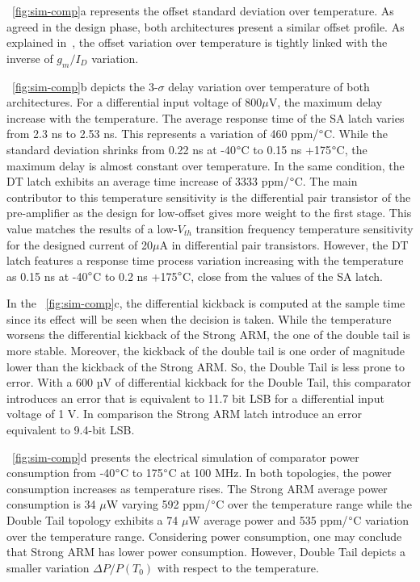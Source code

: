\figurename~\ref{fig:sim-comp}a represents the offset standard deviation over temperature. As agreed in the design phase, both architectures present a similar offset profile. As explained in~\cite{Fonseca2017}, the offset variation over temperature is tightly linked with the inverse of \(g_{m}/I_D\) variation.

\figurename~\ref{fig:sim-comp}b depicts the 3-\(\sigma \) delay variation over temperature of both architectures. For a differential input voltage of 800\(\mu \)V, the maximum delay increase with the temperature. The average response time of the SA latch varies from 2.3 ns to 2.53 ns. This represents a variation of 460 ppm/\(\degree \)C. While the standard deviation shrinks from 0.22 ns at -40\(\degree \)C to 0.15 ns +175\(\degree \)C, the maximum delay is almost constant over temperature. In the same condition, the DT latch exhibits an average time increase of 3333 ppm/\(\degree \)C. The main contributor to this temperature sensitivity is the differential pair transistor of the pre-amplifier as the design for low-offset gives more weight to the first stage. This value matches the results of a low-\(V_{th} \) transition frequency temperature sensitivity for the designed current of 20\(\mu \)A in differential pair transistors. However, the DT latch features a response time process variation increasing with the temperature as  0.15 ns at -40\(\degree \)C to 0.2 ns +175\(\degree \)C, close from the values of the SA latch.

In the \figurename~\ref{fig:sim-comp}c, the differential kickback is computed at the sample time since its effect will be seen when the decision is taken. While the temperature worsens the differential kickback of the Strong ARM, the one of the double tail is more stable. Moreover, the kickback of the double tail is one order of magnitude lower than the kickback of the Strong ARM\@. So, the Double Tail is less prone to error. With a 600 µV of differential kickback for the Double Tail, this comparator introduces an error that is equivalent to 11.7 bit LSB for a differential input voltage of 1 V. In comparison the Strong ARM latch introduce an error equivalent to 9.4-bit LSB\@.

\figurename~\ref{fig:sim-comp}d presents the electrical simulation of comparator power consumption from -40\(\degree \)C to 175\(\degree \)C at 100 MHz. In both topologies, the power consumption increases as temperature rises. The Strong ARM average power consumption is 34 \(\mu \)W varying 592 ppm/\(\degree \)C over the temperature range while the Double Tail topology exhibits a 74 \(\mu \)W average power and 535 ppm/\(\degree \)C variation over the temperature range. Considering power consumption, one may conclude that Strong ARM has lower power consumption. However, Double Tail depicts a smaller variation \(\Delta P/P(T_0)\) with respect to the temperature.

